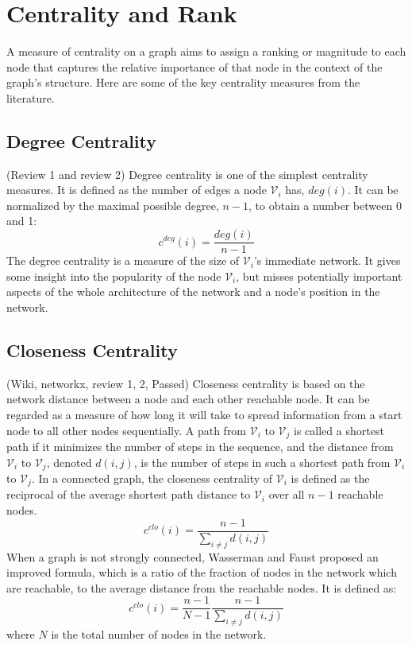 \documentclass[\main/thesis.tex]{subfiles}
\begin{document}
\section{Centrality and Rank}
A measure of centrality on a graph aims to assign a ranking or magnitude to each node that captures the relative importance of that node in the context of the graph’s structure. Here are some of the key centrality measures from the literature.
\subsection{Degree Centrality}
(Review 1 and review 2) Degree centrality is one of the simplest centrality measures. It is defined as the number of edges a node $\mathcal{V}_i$ has, $deg(i)$. It can be normalized by the maximal possible degree, $n-1$, to obtain a number between 0 and 1:
\begin{equation}
c^{deg}(i) = \frac{deg(i)}{n-1}
\end{equation}
The degree centrality is a measure of the size of $\mathcal{V}_i$'s immediate network. It gives some insight into the popularity of the node $\mathcal{V}_i$, but misses potentially important aspects of the whole architecture of the network and a node’s position in the network.
\subsection{Closeness Centrality}
(Wiki, networkx, review 1, 2, Passed) Closeness centrality \cite{freeman1978centrality} is based on the network distance between a node and each other reachable node. It can be regarded as a measure of how long it will take to spread information from a start node to all other nodes sequentially. A path from $\mathcal{V}_i$ to $\mathcal{V}_j$ is called a shortest path if it minimizes the number of steps in the sequence, and the distance from $\mathcal{V}_i$ to $\mathcal{V}_j$, denoted $d(i,j)$, is the number of steps in such a shortest path from $\mathcal{V}_i$ to $\mathcal{V}_j$. In a connected graph, the closeness centrality of $\mathcal{V}_i$ is defined as the reciprocal of the average shortest path distance to $\mathcal{V}_i$ over all $n-1$ reachable nodes.
\begin{equation}
c^{clo}(i) = \frac{n-1}{\sum_{i\neq j}d(i,j)}
\end{equation}
When a graph is not strongly connected, Wasserman and Faust \cite{wasserman1994social} proposed an improved formula, which is a ratio of the fraction of nodes in the network which are reachable, to the average distance from the reachable nodes. It is defined as:
\begin{equation}
c^{clo}(i) = \frac{n-1}{N-1}\frac{n-1}{\sum_{i\neq j}d(i,j)}
\end{equation}
where $N$ is the total number of nodes in the network.
\end{document}
